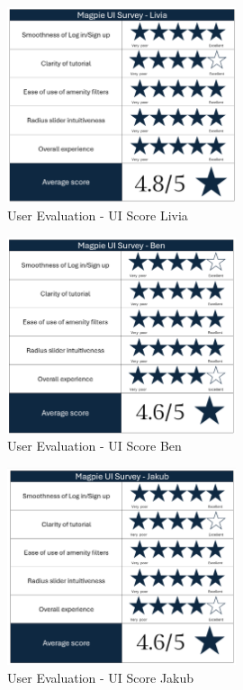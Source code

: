 \begin{figure}[htbp]
    \centering
    \includegraphics[width=0.6\textwidth]{images/survey-livia.png}
    \caption{User Evaluation - UI Score Livia}
    \label{fig:liviascore}
\end{figure}

\begin{figure}[htbp]
    \centering
    \includegraphics[width=0.6\textwidth]{images/survey-ben.png}
    \caption{User Evaluation - UI Score Ben}
    \label{fig:benscore}
\end{figure}

\begin{figure}[htbp]
    \centering
    \includegraphics[width=0.6\textwidth]{images/survey-jakub.png}
    \caption{User Evaluation - UI Score Jakub}
    \label{fig:jakubscore}
\end{figure}

